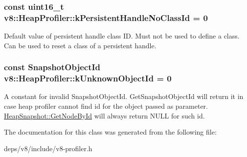 \subsubsection[{k\+Persistent\+Handle\+No\+Class\+Id}]{\setlength{\rightskip}{0pt plus 5cm}const uint16\+\_\+t v8\+::\+Heap\+Profiler\+::k\+Persistent\+Handle\+No\+Class\+Id = 0\hspace{0.3cm}{\ttfamily [static]}}\label{classv8_1_1_heap_profiler_a272c9af3ea5cd90a2737af3d22a7eb78}
Default value of persistent handle class I\+D. Must not be used to define a class. Can be used to reset a class of a persistent handle. \hypertarget{classv8_1_1_heap_profiler_abf2b9d8facb18473f9b124ab8baf5786}{}
\subsubsection[{k\+Unknown\+Object\+Id}]{\setlength{\rightskip}{0pt plus 5cm}const Snapshot\+Object\+Id v8\+::\+Heap\+Profiler\+::k\+Unknown\+Object\+Id = 0\hspace{0.3cm}{\ttfamily [static]}}\label{classv8_1_1_heap_profiler_abf2b9d8facb18473f9b124ab8baf5786}
A constant for invalid Snapshot\+Object\+Id. Get\+Snapshot\+Object\+Id will return it in case heap profiler cannot find id for the object passed as parameter. \hyperlink{classv8_1_1_heap_snapshot_a023696f94fe538380922bf2c40c97b7b}{Heap\+Snapshot\+::\+Get\+Node\+By\+Id} will always return N\+U\+L\+L for such id. 

The documentation for this class was generated from the following file\+:\begin{DoxyCompactItemize}
\item 
deps/v8/include/v8-\/profiler.\+h\end{DoxyCompactItemize}

